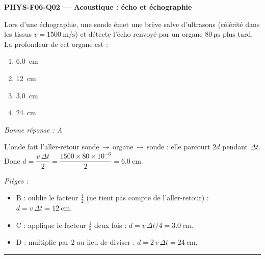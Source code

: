 \documentclass[11pt,a4paper]{article}
\begin{document}
\noindent\textbf{PHYS-F06-Q02 --- Acoustique : écho et échographie}\par
Lors d'une échographie, une sonde émet une brève salve d'ultrasons (célérité dans les tissus $v = \qty{1500}{\metre\per\second}$) et détecte l'écho renvoyé par un organe $\qty{80}{\micro\second}$ plus tard. La profondeur de cet organe est :
\begin{enumerate}[label=\Alph*)]
\item \qty{6.0}{\centi\metre}
\item \qty{12}{\centi\metre}
\item \qty{3.0}{\centi\metre}
\item \qty{24}{\centi\metre}
\end{enumerate}
\textit{Bonne réponse : A}\par
L'onde fait l'aller-retour sonde\,$\to$\,organe\,$\to$\,sonde : elle parcourt $2d$ pendant $\Delta t$. Donc $d = \dfrac{v\,\Delta t}{2} = \dfrac{1500 \times 80\times10^{-6}}{2} = \qty{6.0}{\centi\metre}$.\par
\textit{Pièges :}
\begin{itemize}
\item B : oublie le facteur $\tfrac12$ (ne tient pas compte de l'aller-retour) : $d = v\,\Delta t = \qty{12}{\centi\metre}$.
\item C : applique le facteur $\tfrac12$ deux fois : $d = v\,\Delta t/4 = \qty{3.0}{\centi\metre}$.
\item D : multiplie par $2$ au lieu de diviser : $d = 2\,v\,\Delta t = \qty{24}{\centi\metre}$.
\end{itemize}
\vspace{8pt}\hrule\vspace{8pt}
\end{document}
